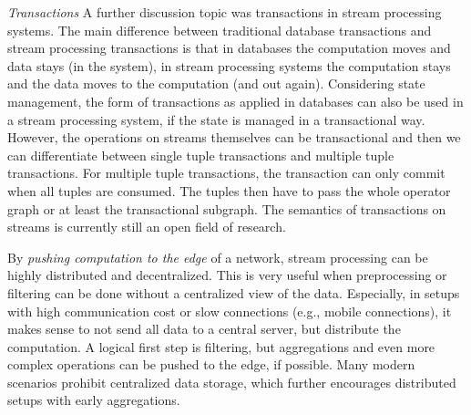 \emph{Transactions} A further discussion topic was transactions in stream processing systems.
The main difference between traditional database transactions and stream
processing transactions is that in databases the computation moves and
data stays (in the system), in stream processing systems the computation stays
and the data moves to the computation (and out again). Considering state management, the form of transactions as applied in databases
can also be used in a stream processing system, if the state is managed in a
transactional way. However, the operations on streams themselves can be
transactional and then we can differentiate between single tuple transactions
and multiple tuple transactions. For multiple tuple transactions, the
transaction can only commit when all tuples are consumed. The tuples then have
to pass the whole operator graph or at least the transactional subgraph. The semantics of transactions on streams is currently still an open
field of research.

By \emph{pushing computation to the edge} of a network, stream processing can
be highly distributed and decentralized. This is very useful when preprocessing
or filtering can be done without a centralized view of the data. Especially, in
setups with high communication cost or slow connections (e.g., mobile
connections), it makes sense to not send all data to a central server, but
distribute the computation. A logical first step is filtering, but aggregations
and even more complex operations can be pushed to the edge, if possible. Many
modern scenarios prohibit centralized data storage, which further encourages
distributed setups with early aggregations. \iffalse Primary points of research are the
declarativity for specifying highly distributed data processing programs and
the architecture of systems to support these use cases.\fi

\iffalse
\emph{Other topics discussed} were ad hoc queries and graph stream processing.
Most current systems only discuss long running queries, but in many use cases
(e.g., sports, automotive) streams can be short lived as can be stream queries.
\fi